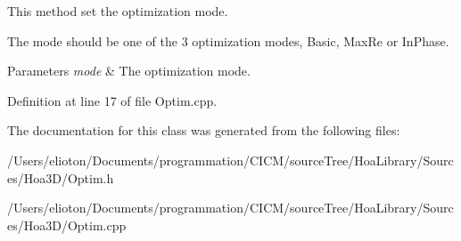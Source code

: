 This method set the optimization mode. 

The mode should be one of the 3 optimization modes, Basic, Max\-Re or In\-Phase.


\begin{DoxyParams}{Parameters}
{\em mode} & The optimization mode. \\
\hline
\end{DoxyParams}


Definition at line 17 of file Optim.\-cpp.



The documentation for this class was generated from the following files\-:\begin{DoxyCompactItemize}
\item 
/\-Users/elioton/\-Documents/programmation/\-C\-I\-C\-M/source\-Tree/\-Hoa\-Library/\-Sources/\-Hoa3\-D/Optim.\-h\item 
/\-Users/elioton/\-Documents/programmation/\-C\-I\-C\-M/source\-Tree/\-Hoa\-Library/\-Sources/\-Hoa3\-D/Optim.\-cpp\end{DoxyCompactItemize}
